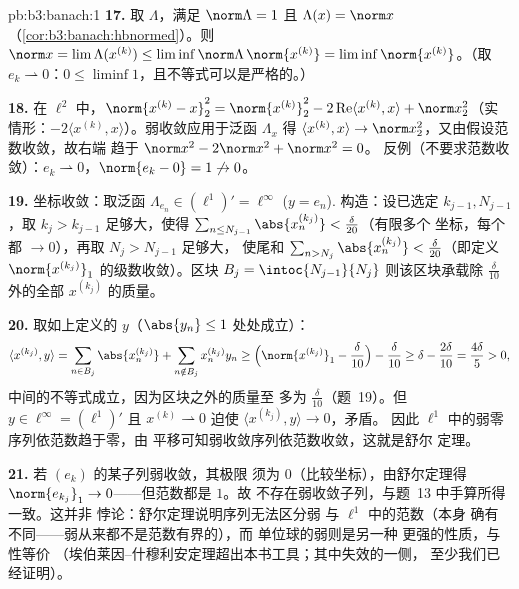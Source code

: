 \begin{solution}{pb:b3:banach:1}
\textbf{17.} 取 $\Lambda$，满足 $\norm\Lambda = 1$ 且
$\Lambda(x) = \norm x$（\cref{cor:b3:banach:hbnormed}）。则
$\norm x = \lim\Lambda(x^{(k)}) \leq
\liminf\norm\Lambda\,\norm{x^{(k)}} =
\liminf\norm{x^{(k)}}$。（取 $e_k \rightharpoonup 0$：$0
\leq \liminf 1$，且不等式可以是严格的。）

\textbf{18.} 在 $\ell^2$ 中，$\norm{x^{(k)} - x}_2^2 =
\norm{x^{(k)}}_2^2 - 2\operatorname{Re}\langle x^{(k)},
x\rangle + \norm x_2^2$（实情形：$-2\langle x^{(k)},
x\rangle$）。弱收敛应用于泛函
$\Lambda_x$ 得 $\langle x^{(k)}, x\rangle \to \norm
x_2^2$，又由假设范数收敛，故右端
趋于 $\norm x^2 - 2\norm x^2 + \norm x^2 = 0$。
反例（不要求范数收敛）：$e_k
\rightharpoonup 0$，$\norm{e_k - 0} = 1 \not\to 0$。

\textbf{19.} 坐标收敛：取泛函
$\Lambda_{e_n} \in (\ell^1)' = \ell^\infty$ ($y = e_n$).
构造：设已选定 $k_{j-1}, N_{j-1}$，取 $k_j >
k_{j-1}$ 足够大，使得 $\sum_{n \leq
N_{j-1}}\abs{x^{(k_j)}_n} < \frac\delta{20}$（有限多个
坐标，每个都 $\to 0$），再取 $N_j > N_{j-1}$ 足够大，
使尾和 $\sum_{n > N_j}\abs{x^{(k_j)}_n} <
\frac\delta{20}$（即定义
$\norm{x^{(k_j)}}_1$ 的级数收敛）。区块 $B_j = \intoc{N_{j-1}}{N_j}$
则该区块承载除 $\frac\delta{10}$ 外的全部
$x^{(k_j)}$ 的质量。

\textbf{20.} 取如上定义的 $y$（$\abs{y_n} \leq 1$
处处成立）：
\[
\langle x^{(k_j)}, y\rangle
= \sum_{n \in B_j}\abs{x^{(k_j)}_n}
+ \sum_{n \notin B_j}x^{(k_j)}_ny_n
\geq \Bigl(\norm{x^{(k_j)}}_1 - \frac\delta{10}\Bigr) -
\frac\delta{10}
\geq \delta - \frac{2\delta}{10} = \frac{4\delta}5 > 0,
\]
中间的不等式成立，因为区块之外的质量至
多为 $\frac\delta{10}$（题~19）。但 $y \in
\ell^\infty = (\ell^1)'$ 且 $x^{(k)} \rightharpoonup 0$
迫使 $\langle x^{(k_j)}, y\rangle \to 0$，矛盾。
因此 $\ell^1$ 中的弱零序列依范数趋于零，由
平移可知弱收敛序列依范数收敛，这就是舒尔
定理。

\textbf{21.} 若 $(e_k)$ 的某子列弱收敛，其极限
须为 $0$（比较坐标），由舒尔定理得 $\norm{e_{k_j}}_1
\to 0$——但范数都是 $1$。故
不存在弱收敛子列，与题~13 中手算所得一致。这并非
悖论：舒尔定理说明序列无法区分弱
与 $\ell^1$ 中的范数（本身
确有不同——弱从来都不是范数有界的），而
单位球的弱则是另一种
更强的性质，与性等价
（埃伯莱因–什穆利安定理超出本书工具；其中失效的一侧，
至少我们已经证明）。


\end{solution}

